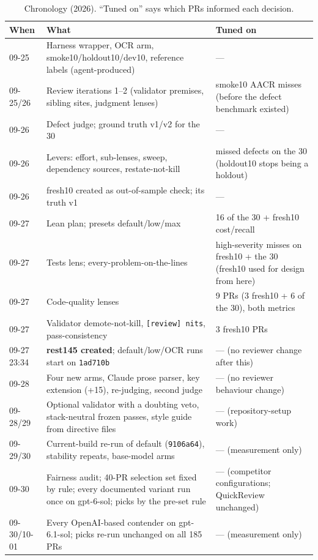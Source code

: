 \documentclass[11pt,a4paper]{article}
\newcommand{\qcr}{QuickReview}
\newcommand{\code}[1]{\texttt{#1}}
\begin{document}
\begin{table}[h]
  \centering
  \small
  \caption{Chronology (2026). ``Tuned on'' says which PRs informed each
  decision.}
  \label{tab:chron}
  \begin{tabularx}{\textwidth}{l X X}
    \toprule
    When & What & Tuned on \\
    \midrule
    09-25 & Harness wrapper, OCR arm, smoke10/holdout10/dev10, reference labels (agent-produced) & --- \\
    09-25/26 & Review iterations 1--2 (validator premises, sibling sites, judgment lenses) & smoke10 AACR misses (before the defect benchmark existed) \\
    09-26 & Defect judge; ground truth v1/v2 for the 30 & --- \\
    09-26 & Levers: effort, sub-lenses, sweep, dependency sources, restate-not-kill & missed defects on the 30 (holdout10 stops being a holdout) \\
    09-26 & fresh10 created as out-of-sample check; its truth v1 & --- \\
    09-27 & Lean plan; presets default/low/max & 16 of the 30 + fresh10 cost/recall \\
    09-27 & Tests lens; every-problem-on-the-lines & high-severity misses on fresh10 + the 30 (fresh10 used for design from here) \\
    09-27 & Code-quality lenses & 9 PRs (3 fresh10 + 6 of the 30), both metrics \\
    09-27 & Validator demote-not-kill, \code{[review] nits}, pass-consistency & 3 fresh10 PRs \\
    09-27 23:34 & \textbf{rest145 created}; default/low/OCR runs start on \code{1ad710b} & --- (no reviewer change after this) \\
    09-28 & Four new arms, Claude prose parser, key extension (+15), re-judging, second judge & --- (no reviewer behaviour change) \\
    09-28/29 & Optional validator with a doubting veto, stack-neutral frozen passes, style guide from directive files & --- (repository-setup work) \\
    09-29/30 & Current-build re-run of default (\code{9106a64}), stability repeats, base-model arms & --- (measurement only) \\
    09-30 & Fairness audit; 40-PR selection set fixed by rule; every documented variant run once on gpt-6-sol; picks by the pre-set rule & --- (competitor configurations; \qcr{} unchanged) \\
    09-30/10-01 & Every OpenAI-based contender on gpt-6.1-sol; picks re-run unchanged on all 185 PRs & --- (measurement only) \\
    \bottomrule
  \end{tabularx}
\end{table}
\end{document}
